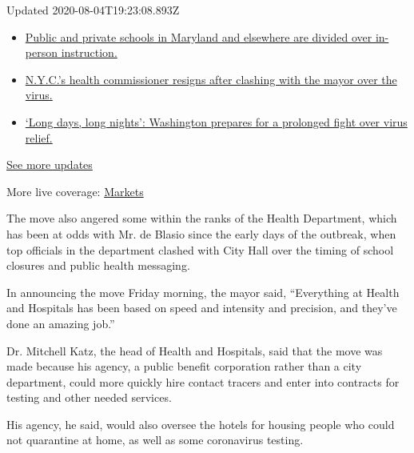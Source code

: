 Updated 2020-08-04T19:23:08.893Z

\begin{itemize}
\tightlist
\item
  \href{https://www.nytimes3xbfgragh.onion/2020/08/04/world/coronavirus-cases.html?action=click\&pgtype=Article\&state=default\&region=MAIN_CONTENT_1\&context=storylines_live_updates\#link-4825b93}{Public
  and private schools in Maryland and elsewhere are divided over
  in-person instruction.}
\item
  \href{https://www.nytimes3xbfgragh.onion/2020/08/04/world/coronavirus-cases.html?action=click\&pgtype=Article\&state=default\&region=MAIN_CONTENT_1\&context=storylines_live_updates\#link-4d1eafa8}{N.Y.C.'s
  health commissioner resigns after clashing with the mayor over the
  virus.}
\item
  \href{https://www.nytimes3xbfgragh.onion/2020/08/04/world/coronavirus-cases.html?action=click\&pgtype=Article\&state=default\&region=MAIN_CONTENT_1\&context=storylines_live_updates\#link-6b644638}{`Long
  days, long nights': Washington prepares for a prolonged fight over
  virus relief.}
\end{itemize}

\href{https://www.nytimes3xbfgragh.onion/2020/08/04/world/coronavirus-cases.html?action=click\&pgtype=Article\&state=default\&region=MAIN_CONTENT_1\&context=storylines_live_updates}{See
more updates}

More live coverage:
\href{https://www.nytimes3xbfgragh.onion/live/2020/08/04/business/stock-market-today-coronavirus?action=click\&pgtype=Article\&state=default\&region=MAIN_CONTENT_1\&context=storylines_live_updates}{Markets}

The move also angered some within the ranks of the Health Department,
which has been at odds with Mr. de Blasio since the early days of the
outbreak, when top officials in the department clashed with City Hall
over the timing of school closures and public health messaging.

In announcing the move Friday morning, the mayor said, ``Everything at
Health and Hospitals has been based on speed and intensity and
precision, and they've done an amazing job.''

Dr. Mitchell Katz, the head of Health and Hospitals, said that the move
was made because his agency, a public benefit corporation rather than a
city department, could more quickly hire contact tracers and enter into
contracts for testing and other needed services.

His agency, he said, would also oversee the hotels for housing people
who could not quarantine at home, as well as some coronavirus testing.

